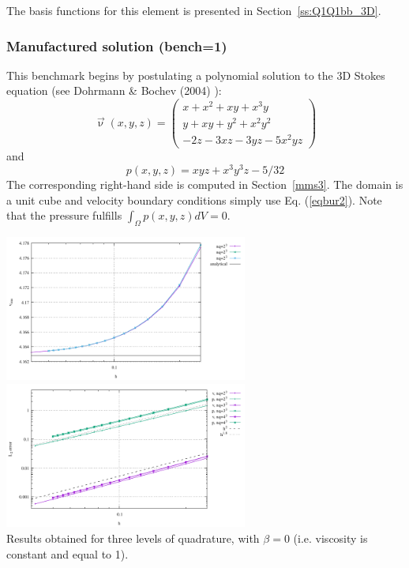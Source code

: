 
The basis functions for this element is presented in Section~\ref{ss:Q1Q1bb_3D}.

\subsubsection*{Manufactured solution (bench=1)}

This benchmark begins by postulating a polynomial solution 
to the 3D Stokes equation (see Dohrmann \& Bochev (2004) \cite{dobo04}):
\begin{equation}
\vec{\upnu}(x,y,z)
=
\left(
\begin{array}{c}
x+x^2+xy+x^3y \\
y + xy + y^2 + x^2 y^2\\
-2z - 3xz - 3yz - 5x^2 yz
\end{array}
\right)
\label{eqbur2}
\end{equation}
and
\begin{equation}
p(x,y,z) = xyz + x^3 y^3z - 5/32
\end{equation}
The corresponding right-hand side is computed in Section~\ref{mms3}.
The domain is a unit cube and velocity boundary conditions
simply use Eq. (\ref{eqbur2}).
Note that the pressure fulfills $\int_\Omega p(x,y,z) dV = 0.$

\begin{center}
\includegraphics[width=8cm]{python_codes/fieldstone_82/results/mms/vrms.pdf}
\includegraphics[width=8cm]{python_codes/fieldstone_82/results/mms/conv.pdf}\\
{\captionfont Results obtained for three levels of quadrature, with $\beta=0$ (i.e.
viscosity is constant and equal to 1).}
\end{center}


